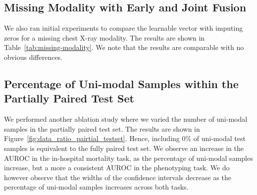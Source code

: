 \documentclass[pmlr]{jmlr}
\begin{document}
\newpage
\subsection{Missing Modality with Early and Joint Fusion} \label{missingtoken}
We also ran initial experiments to compare the learnable vector with imputing zeros for a missing chest X-ray modality. The results are shown in Table~\ref{tab:missing-modality}. We note that the results are comparable with no obvious differences.  


\begin{table*}[h!]
    \centering
    \caption{\textbf{Missing modality with early and joint fusion.} We report the AUROC and AUPRC results on the entire test set (), including samples with missing chest X-ray images (substituted with a zeros or a learnable vector) All methods below were pre-trained using the () training set and a fixed learning rate of 0.0001.} \vspace{-1mm}
    \label{tab:missing-modality}
\end{table*}


\subsection{Percentage of Uni-modal Samples within the Partially Paired Test Set}
\label{unimodalpercPARTIAL}
We performed another ablation study where we varied the number of uni-modal samples in the partially paired test set. The results are shown in Figure~\ref{fig:data_ratio_pairtial_testset}. Hence, including 0\% of uni-modal test samples is equivalent to the fully paired test set. We observe an increase in the AUROC in the in-hospital mortality task, as the percentage of uni-modal samples increase, but a more a consistent AUROC in the phenotyping task. We do however observe that the widths of the confidence intervals decrease as the percentage of uni-modal samples increases across both tasks. 
\end{document}
